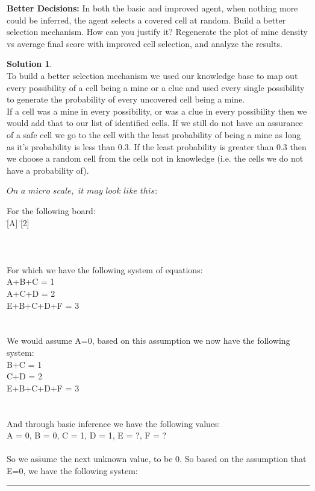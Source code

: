 \documentclass{article}
\theoremstyle{definition}
\def\fline{\rule{0.75\linewidth}{0.5pt}}
\newcommand{\finishline}{\vspace{-15pt}\begin{center}\fline\end{center}}
\newtheorem*{solution*}{Solution}
\newenvironment{solution}{\begin{solution*}}{{\finishline} \end{solution*}}
\begin{document}
\textbf{Better Decisions: }
	In both the basic and improved agent, when nothing more could be inferred, the agent selects a covered cell at random. Build a better selection mechanism. How can you justify it? Regenerate the plot of mine density vs average final score with improved cell selection, and analyze the results.
\begin{solution} \hfill \\
    To build a better selection mechanism we used our knowledge base to map out every possibility of a cell being a mine or a clue and used every single possibility to generate the probability of every uncovered cell being a mine. \\If a cell was a mine in every possibility, or was a clue in every possibility then we would add that to our list of identified cells. If we still do not have an assurance of a safe cell we go to the cell with the least probability of being a mine as long as it's probability is less than 0.3. If the least probability is greater than 0.3 then we choose a random cell from the cells not in knowledge (i.e. the cells we do not have a probability of). 
    
    $On$ $a$ $micro$ $scale,$ $it$ $may$ $look$ $like$ $this$: 
    \begin{tabbing}
    For the \=following board:\\
    \>[1] \=[A] \=[2] \\ 
    \>[B] \>[C] \>[D] \\
    \>[E] \>[3] \>[F] \\\\ 
    
    For which we have the following system of equations: \\
	\>A+B+C = 1 \\
	\>A+C+D = 2 \\
	\>E+B+C+D+F = 3\=\\
     \\\\
	
    We would assume A=0, based on this assumption we now have the following system:\\
    \>B+C = 1 \\
	\>C+D = 2 \\
	\>E+B+C+D+F = 3\=\\
    \\\\
    And through basic inference we have the following values: \\
    {A = 0, B = 0, C = 1, D = 1, E = ?, F = ?}
    \\\\
    So we as\=sume the next unknown value, to be 0. So based on the assumption that E=0, we have the following system: \\
    

\end{tabbing}
\end{solution}
\end{document}
